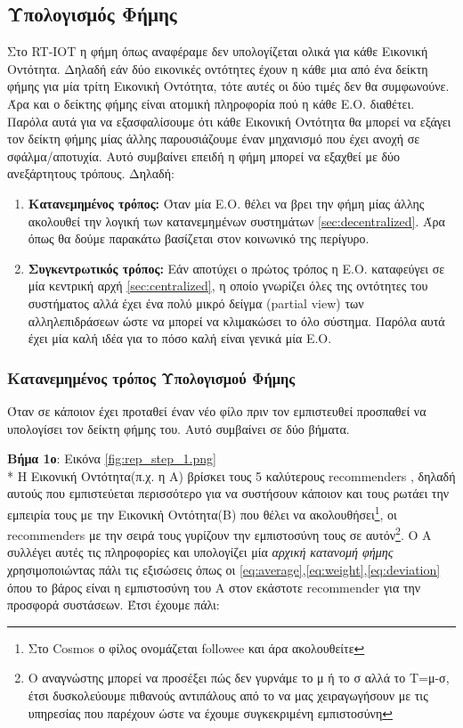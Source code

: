 \subsection{Υπολογισμός Φήμης}\label{sec:calculate_rep}
Στο RT-IOT η φήμη όπως αναφέραμε δεν υπολογίζεται ολικά για κάθε Εικονική Οντότητα. Δηλαδή εάν δύο εικονικές οντότητες έχουν η κάθε μια από ένα δείκτη φήμης για μία τρίτη Εικονική Οντότητα, τότε αυτές οι δύο τιμές δεν θα συμφωνούνε. Άρα και ο δείκτης φήμης είναι ατομική πληροφορία πού η κάθε Ε.Ο. διαθέτει. Παρόλα αυτά για να εξασφαλίσουμε ότι κάθε Εικονική Οντότητα θα μπορεί να εξάγει τον δείκτη φήμης μίας άλλης παρουσιάζουμε έναν μηχανισμό που έχει ανοχή σε σφάλμα/αποτυχία. Αυτό συμβαίνει επειδή η φήμη μπορεί να εξαχθεί με δύο ανεξάρτητους τρόπους. Δηλαδή:
\begin{enumerate}
\item \textbf{Κατανεμημένος τρόπος:} Όταν μία Ε.Ο. θέλει να βρει την φήμη μίας άλλης ακολουθεί την λογική των κατανεμημένων συστημάτων \ref{sec:decentralized}. Άρα όπως θα δούμε παρακάτω βασίζεται στον κοινωνικό της περίγυρο.

\item \textbf{Συγκεντρωτικός τρόπος:} Εάν αποτύχει ο πρώτος τρόπος η Ε.Ο. καταφεύγει σε μία κεντρική αρχή \ref{sec:centralized},  η οποίο γνωρίζει όλες της οντότητες του συστήματος αλλά έχει ένα πολύ μικρό δείγμα (partial view) των αλληλεπιδράσεων ώστε να μπορεί να κλιμακώσει το όλο σύστημα. Παρόλα αυτά έχει μία καλή ιδέα για το πόσο καλή είναι γενικά μία Ε.Ο.

\end{enumerate}

\subsubsection{Κατανεμημένος τρόπος Υπολογισμού Φήμης}
Όταν σε κάποιον έχει προταθεί έναν νέο φίλο πριν τον εμπιστευθεί προσπαθεί να υπολογίσει τον δείκτη φήμης του. Αυτό συμβαίνει σε δύο βήματα.

\textbf{Βήμα 1ο}: Εικόνα \ref{fig:rep_step_1.png} \\*
Η Εικονική Οντότητα(π.χ. η Α) βρίσκει τους 5 καλύτερους recommenders , δηλαδή αυτούς που εμπιστεύεται περισσότερο για να συστήσουν κάποιον και τους ρωτάει την εμπειρία τους με την Εικονική Οντότητα(Β) που θέλει να ακολουθήσει\footnote{Στο Cosmos ο φίλος ονομάζεται followee και άρα ακολουθείτε}, οι recommenders  με την σειρά τους γυρίζουν την εμπιστοσύνη τους σε αυτόν\footnote{Ο αναγνώστης μπορεί να προσέξει πώς δεν γυρνάμε το μ ή το σ αλλά το Τ=μ-σ, έτσι δυσκολεύουμε πιθανούς αντιπάλους από το να μας χειραγωγήσουν με τις υπηρεσίας που παρέχουν ώστε να έχουμε συγκεκριμένη εμπιστοσύνη}. Ο Α συλλέγει αυτές τις πληροφορίες και υπολογίζει μία \textit{ αρχική κατανομή φήμης } χρησιμοποιώντας πάλι τις εξισώσεις όπως οι \ref{eq:average},\ref{eq:weight},\ref{eq:deviation} όπου το βάρος είναι η εμπιστοσύνη του Α στον εκάστοτε recommender για την προσφορά συστάσεων. Έτσι έχουμε πάλι:

